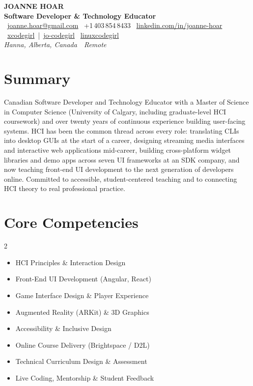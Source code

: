\documentclass[11pt]{article}
\newcommand{\tech}[1]{\textcolor{secondary}{\textbf{#1}}}
\begin{document}
\begin{center}
    {\Huge \textbf{JOANNE HOAR}} \\[4pt]
    {\Large \tech{Software Developer \& Technology Educator}} \\[6pt]
    ~\href{mailto:joanne.hoar@gmail.com}{joanne.hoar@gmail.com}
    \hfill
    ~+1\,403\,854\,8433
    \hfill
    ~\href{https://linkedin.com/in/joanne-hoar/}{linkedin.com/in/joanne-hoar}
    \hfill
    ~\href{https://github.com/xcodegirl}{xcodegirl}~|~\href{https://github.com/jo-codegirl}{jo-codegirl}
    \hfill
    ~\href{https://www.youtube.com/@linuxcodegirl/playlists}{linuxcodegirl}
    \\[2pt]
    \textit{Hanna, Alberta, Canada}~\textbullet~\textit{Remote}
\end{center}

\section*{Summary}
Canadian Software Developer and Technology Educator with a Master of Science in Computer Science (University of Calgary, including graduate-level HCI coursework) and over twenty years of continuous experience building user-facing systems. HCI has been the common thread across every role: translating CLIs into desktop GUIs at the start of a career, designing streaming media interfaces and interactive web applications mid-career, building cross-platform widget libraries and demo apps across seven UI frameworks at an SDK company, and now teaching front-end UI development to the next generation of developers online. Committed to accessible, student-centered teaching and to connecting HCI theory to real professional practice.

\section*{Core Competencies}
\begin{multicols}{2}
\begin{itemize}
    \item HCI Principles \& Interaction Design
    \item Front-End UI Development (Angular, React)
    \item Game Interface Design \& Player Experience
    \item Augmented Reality (ARKit) \& 3D Graphics
    \item Accessibility \& Inclusive Design
    \item Online Course Delivery (Brightspace / D2L)
    \item Technical Curriculum Design \& Assessment
    \item Live Coding, Mentorship \& Student Feedback
\end{itemize}
\end{multicols}
\end{document}
